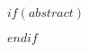 $if(abstract)$
\thispagestyle{plain}
\begin{abstract}
    $abstract$
\end{abstract}
\clearpage
$endif$